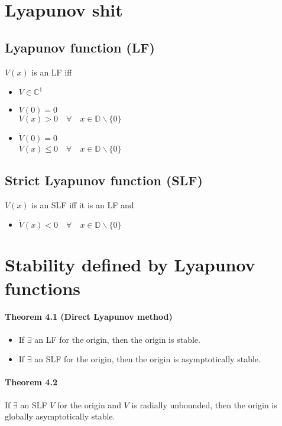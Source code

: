 \section{Lyapunov shit}

\subsection{Lyapunov function (LF)}
$V(x)$ is an LF iff
\begin{itemize}
	\item $V \in \mathbb{C}^1$
	\item $V(0) = 0$ \\
	      $V(x) > 0 \quad \forall \quad x \in \mathbb{D} \backslash \{0\}$
	\item $\dot{V}(0) = 0$ \\
	      $\dot{V}(x) \leq 0 \quad \forall \quad x \in \mathbb{D} \backslash \{0\}$
\end{itemize}

\subsection{Strict Lyapunov function (SLF)}
$V(x)$ is an SLF iff it is an LF and
\begin{itemize}
	\item $\dot{V}(x) < 0 \quad \forall \quad x \in \mathbb{D} \backslash \{0\}$
\end{itemize}

\section{Stability defined by Lyapunov functions}
\paragraph{Theorem 4.1 (Direct Lyapunov method)}
\begin{itemize}
	\item If $\exists$ an LF for the origin, then the origin is stable.
	\item If $\exists$ an SLF for the origin, then the origin is asymptotically stable.
\end{itemize}

\paragraph{Theorem 4.2}
If $\exists$ an SLF $V$ for the origin and $V$ is radially unbounded, then the origin is globally asymptotically stable.

